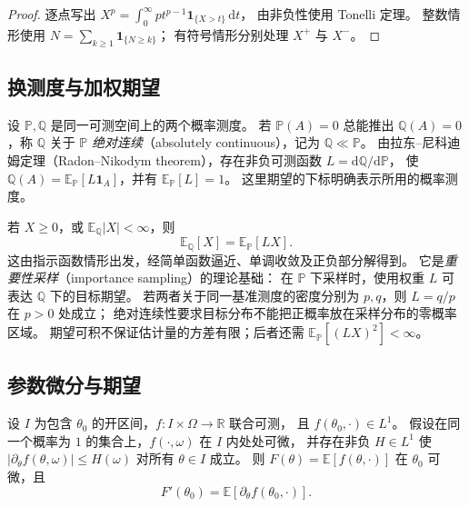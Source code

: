 \documentclass[UTF8,12pt,a4paper,fontset=fandol]{ctexart}
\begin{document}
\begin{proof}
逐点写出
$X^p=\int_0^\infty p t^{p-1}\mathbf1_{\{X>t\}}\,\mathrm dt$，
由非负性使用 Tonelli 定理。
整数情形使用 $N=\sum_{k\geq1}\mathbf1_{\{N\geq k\}}$；
有符号情形分别处理 $X^+$ 与 $X^-$。
\end{proof}

\subsection{换测度与加权期望}

设 $\mathbb P,\mathbb Q$ 是同一可测空间上的两个概率测度。
若 $\mathbb P(A)=0$ 总能推出 $\mathbb Q(A)=0$，称 $\mathbb Q$ 关于 $\mathbb P$
\emph{绝对连续}（absolutely continuous），记为 $\mathbb Q\ll\mathbb P$。
由拉东--尼科迪姆定理（Radon--Nikodym theorem），存在非负可测函数
$L=\mathrm d\mathbb Q/\mathrm d\mathbb P$，
使 $\mathbb Q(A)=\mathbb E_{\mathbb P}[L\mathbf1_A]$，并有 $\mathbb E_{\mathbb P}[L]=1$。
这里期望的下标明确表示所用的概率测度。

若 $X\geq0$，或 $\mathbb E_{\mathbb Q}|X|<\infty$，则
\begin{equation}
  \mathbb E_{\mathbb Q}[X]
  =\mathbb E_{\mathbb P}[LX].
  \label{eq:expectation-change-measure}
\end{equation}
这由指示函数情形出发，经简单函数逼近、单调收敛及正负部分解得到。
它是\emph{重要性采样}（importance sampling）的理论基础：
在 $\mathbb P$ 下采样时，使用权重 $L$ 可表达 $\mathbb Q$ 下的目标期望。
若两者关于同一基准测度的密度分别为 $p,q$，则 $L=q/p$ 在 $p>0$ 处成立；
绝对连续性要求目标分布不能把正概率放在采样分布的零概率区域。
期望可积不保证估计量的方差有限；后者还需 $\mathbb E_{\mathbb P}[(LX)^2]<\infty$。

\subsection{参数微分与期望}

\begin{proposition}[期望下微分的一个充分条件]
\label{prop:expectation-differentiation}
设 $I$ 为包含 $\theta_0$ 的开区间，$f:I\times\Omega\to\mathbb R$ 联合可测，
且 $f(\theta_0,\cdot)\in L^1$。
假设在同一个概率为 $1$ 的集合上，$f(\cdot,\omega)$ 在 $I$ 内处处可微，
并存在非负 $H\in L^1$ 使
$|\partial_\theta f(\theta,\omega)|\leq H(\omega)$ 对所有 $\theta\in I$ 成立。
则 $F(\theta)=\mathbb E[f(\theta,\cdot)]$ 在 $\theta_0$ 可微，且
\[
  F'(\theta_0)
  =\mathbb E[\partial_\theta f(\theta_0,\cdot)].
\]
\end{proposition}
\end{document}
